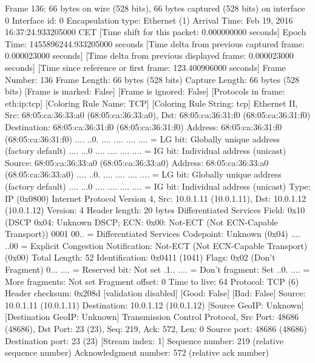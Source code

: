 Frame 136: 66 bytes on wire (528 bits), 66 bytes captured (528 bits) on interface 0
    Interface id: 0
    Encapsulation type: Ethernet (1)
    Arrival Time: Feb 19, 2016 16:37:24.933205000 CET
    [Time shift for this packet: 0.000000000 seconds]
    Epoch Time: 1455896244.933205000 seconds
    [Time delta from previous captured frame: 0.000023000 seconds]
    [Time delta from previous displayed frame: 0.000023000 seconds]
    [Time since reference or first frame: 123.400906000 seconds]
    Frame Number: 136
    Frame Length: 66 bytes (528 bits)
    Capture Length: 66 bytes (528 bits)
    [Frame is marked: False]
    [Frame is ignored: False]
    [Protocols in frame: eth:ip:tcp]
    [Coloring Rule Name: TCP]
    [Coloring Rule String: tcp]
Ethernet II, Src: 68:05:ca:36:33:a0 (68:05:ca:36:33:a0), Dst: 68:05:ca:36:31:f0 (68:05:ca:36:31:f0)
    Destination: 68:05:ca:36:31:f0 (68:05:ca:36:31:f0)
        Address: 68:05:ca:36:31:f0 (68:05:ca:36:31:f0)
        .... ..0. .... .... .... .... = LG bit: Globally unique address (factory default)
        .... ...0 .... .... .... .... = IG bit: Individual address (unicast)
    Source: 68:05:ca:36:33:a0 (68:05:ca:36:33:a0)
        Address: 68:05:ca:36:33:a0 (68:05:ca:36:33:a0)
        .... ..0. .... .... .... .... = LG bit: Globally unique address (factory default)
        .... ...0 .... .... .... .... = IG bit: Individual address (unicast)
    Type: IP (0x0800)
Internet Protocol Version 4, Src: 10.0.1.11 (10.0.1.11), Dst: 10.0.1.12 (10.0.1.12)
    Version: 4
    Header length: 20 bytes
    Differentiated Services Field: 0x10 (DSCP 0x04: Unknown DSCP; ECN: 0x00: Not-ECT (Not ECN-Capable Transport))
        0001 00.. = Differentiated Services Codepoint: Unknown (0x04)
        .... ..00 = Explicit Congestion Notification: Not-ECT (Not ECN-Capable Transport) (0x00)
    Total Length: 52
    Identification: 0x0411 (1041)
    Flags: 0x02 (Don't Fragment)
        0... .... = Reserved bit: Not set
        .1.. .... = Don't fragment: Set
        ..0. .... = More fragments: Not set
    Fragment offset: 0
    Time to live: 64
    Protocol: TCP (6)
    Header checksum: 0x208d [validation disabled]
        [Good: False]
        [Bad: False]
    Source: 10.0.1.11 (10.0.1.11)
    Destination: 10.0.1.12 (10.0.1.12)
    [Source GeoIP: Unknown]
    [Destination GeoIP: Unknown]
Transmission Control Protocol, Src Port: 48686 (48686), Dst Port: 23 (23), Seq: 219, Ack: 572, Len: 0
    Source port: 48686 (48686)
    Destination port: 23 (23)
    [Stream index: 1]
    Sequence number: 219    (relative sequence number)
    Acknowledgment number: 572    (relative ack number)
